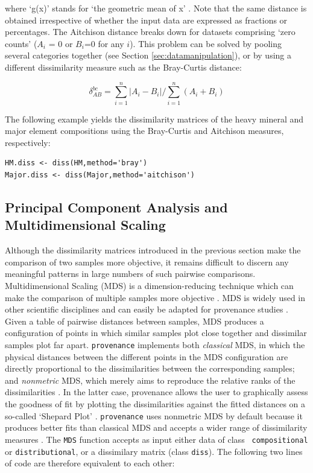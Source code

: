 \documentclass{article}
\begin{document}
where `g(x)’ stands for `the geometric mean of x’
\citep{aitchison1986, vermeesch2013}.  Note that the same distance is
obtained irrespective of whether the input data are expressed as
fractions or percentages. The Aitchison distance breaks down for
datasets comprising `zero counts' ($A_i$ = 0 or $B_i$=0 for any $i$).
This problem can be solved by pooling several categories together (see
Section \ref{sec:datamanipulation}), or by using a different
dissimilarity measure such as the Bray-Curtis distance:

\begin{equation}
\delta^{bc}_{AB} = \sum\limits_{i=1}^{n} |A_i - B_i| \Big/ 
                 \sum\limits_{i=1}^{n} (A_i + B_i)
\label{eq:bray}
\end{equation}

The following example yields the dissimilarity matrices of the heavy
mineral and major element compositions using the Bray-Curtis and
Aitchison measures, respectively:

\begin{verbatim}
HM.diss <- diss(HM,method='bray')
Major.diss <- diss(Major,method='aitchison')
\end{verbatim}

\subsection{Principal Component Analysis and Multidimensional Scaling}
\label{sec:PCAMDS}

Although the dissimilarity matrices introduced in the previous section
make the comparison of two samples more objective, it remains
difficult to discern any meaningful patterns in large numbers of such
pairwise comparisons. Multidimensional Scaling (MDS) is a
dimension-reducing technique which can make the comparison of multiple
samples more objective \citep{borg2005}. MDS is widely used in other
scientific disciplines and can easily be adapted for provenance
studies \citep{vermeesch2013}. Given a table of pairwise distances
between samples, MDS produces a configuration of points in which
similar samples plot close together and dissimilar samples plot far
apart. {\tt provenance} implements both {\it classical} MDS, in which
the physical distances between the different points in the MDS
configuration are directly proportional to the dissimilarities between
the corresponding samples; and {\it nonmetric} MDS, which merely aims
to reproduce the relative ranks of the dissimilarities
\citep{borg2005}. In the latter case, {provenance} allows the user to
graphically assess the goodness of fit by plotting the dissimilarities
against the fitted distances on a so-called `Shepard Plot'
\citep{kruskal1978}. {\tt provenance} uses nonmetric MDS by default
because it produces better fits than classical MDS and accepts a wider
range of dissimilarity measures \citep{kruskal1978, borg2005}. The
{\tt MDS} function accepts as input either data of class {\tt
  compositional} or {\tt distributional}, or a dissimilary matrix
(class {\tt diss}).  The following two lines of code are therefore
equivalent to each other:
\end{document}
